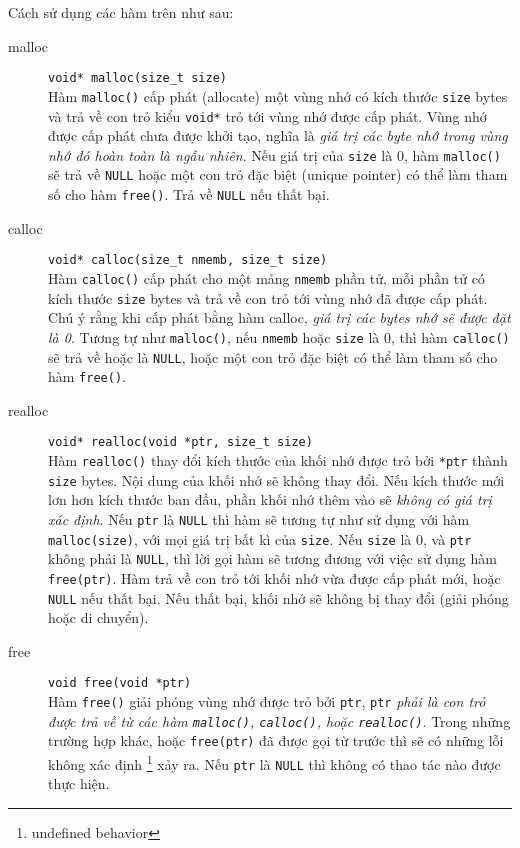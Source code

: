 \documentclass{article}
\begin{document}
Cách sử dụng các hàm trên như sau:
\begin{description}
\item [malloc] \texttt{void* malloc(size\_t size)}\\Hàm \texttt{malloc()} cấp phát (allocate) một vùng nhớ có kích thước \texttt{size} bytes và trả về con trỏ kiểu \texttt{void*} trỏ tới vùng nhớ được cấp phát. Vùng nhớ được cấp phát chưa được khởi tạo, nghĩa là \emph{giá trị các byte nhớ trong vùng nhớ đó hoàn toàn là ngẫu nhiên}. Nếu giá trị của \texttt{size} là 0, hàm \texttt{malloc()} sẽ trả về \texttt{NULL} hoặc một con trỏ đặc biệt (unique pointer) có thể làm tham số cho hàm \texttt{free()}. Trả về \texttt{NULL} nếu thất bại.

\item[calloc] \texttt{void* calloc(size\_t nmemb, size\_t size)}\\Hàm \texttt{calloc()} cấp phát cho một mảng \texttt{nmemb} phần tử, mỗi phần tử có kích thước \texttt{size} bytes và trả về con trỏ tới vùng nhớ đã được cấp phát. Chú ý rằng khi cấp phát bằng hàm calloc, \emph{giá trị các bytes nhớ sẽ được đặt là 0}. Tương tự như \texttt{malloc()}, nếu \texttt{nmemb} hoặc \texttt{size} là 0, thì hàm \texttt{calloc()} sẽ trả về hoặc là \texttt{NULL}, hoặc một con trỏ đặc biệt có thể làm tham số cho hàm \texttt{free()}.

\item[realloc] \texttt{void* realloc(void *ptr, size\_t size)}\\Hàm \texttt{realloc()} thay đổi kích thước của khối nhớ được trỏ bởi \texttt{*ptr} thành \texttt{size} bytes. Nội dung của khối nhớ sẽ không thay đổi. Nếu kích thước mới lơn hơn kích thước ban đầu, phần khối nhớ thêm vào sẽ \emph{không có giá trị xác định}. Nếu \texttt{ptr} là \texttt{NULL} thì hàm sẽ tương tự như sử dụng với hàm \texttt{malloc(size)}, với mọi giá trị bất kì của \texttt{size}. Nếu \texttt{size} là 0, và \texttt{ptr} không phải là \texttt{NULL}, thì lời gọi hàm sẽ tương đương với việc sử dụng hàm \texttt{free(ptr)}. Hàm trả về con trỏ tới khối nhớ vừa được cấp phát mới, hoặc \texttt{NULL} nếu thất bại. Nếu thất bại, khối nhớ sẽ không bị thay đổi (giải phóng hoặc di chuyển).

\item [free] \texttt{void free(void *ptr)}\\ Hàm \texttt{free()} giải phóng vùng nhớ được trỏ bởi \texttt{ptr}, \texttt{ptr} \emph{phải là con trỏ được trả về từ các hàm \texttt{malloc()}, \texttt{calloc()}, hoặc \texttt{realloc()}}. Trong những trường hợp khác, hoặc \texttt{free(ptr)} đã được gọi từ trước thì sẽ có những lỗi không xác định \footnote{undefined behavior} xảy ra. Nếu \texttt{ptr} là \texttt{NULL} thì không có thao tác nào được thực hiện.
\end{description}
\end{document}
